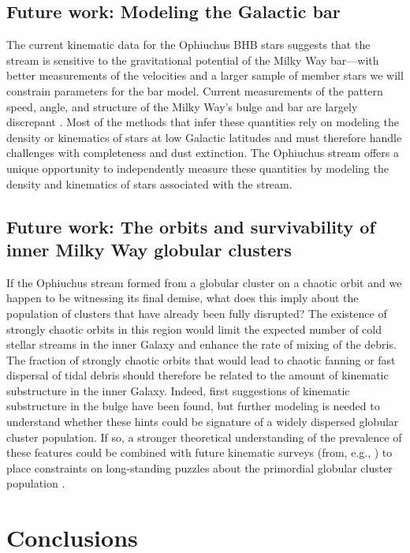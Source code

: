 \documentclass[numberedappendix]{emulateapj}
\begin{document}
\subsection{Future work: Modeling the Galactic bar}

The current kinematic data for the Ophiuchus BHB stars suggests that the stream is sensitive to the gravitational potential of the Milky Way bar---with better measurements of the velocities and a larger sample of member stars we will constrain parameters for the bar model. Current measurements of the pattern speed, angle, and structure of the Milky Way's bulge and bar are largely discrepant \citep[e.g.,][]{wang12, wang13, wegg13, antoja14}. Most of the methods that infer these quantities rely on modeling the density or kinematics of stars at low Galactic latitudes and must therefore handle challenges with completeness and dust extinction. The Ophiuchus stream offers a unique opportunity to independently measure these quantities by modeling the density and kinematics of stars associated with the stream. 

\subsection{Future work: The orbits and survivability of inner Milky Way globular clusters}

If the Ophiuchus stream formed from a globular cluster on a chaotic orbit and we happen to be witnessing its final demise, what does this imply about the population of clusters that have already been fully disrupted? The existence of strongly chaotic orbits in this region would limit the expected number of cold stellar streams in the inner Galaxy and enhance the rate of mixing of the debris. The fraction of strongly chaotic orbits that would lead to chaotic fanning or fast dispersal of tidal debris should therefore be related to the amount of kinematic substructure in the inner Galaxy. Indeed, first suggestions of kinematic substructure in the bulge have been found, but further modeling is needed to understand whether these hints could be signature of a widely dispersed globular cluster population. If so, a stronger theoretical understanding of the prevalence of these features could be combined with future kinematic surveys (from, e.g., ) to place constraints on long-standing puzzles about the primordial globular cluster population \citep[e.g.,][]{murali97, gnedin97}.

\section{Conclusions}\label{sec:conclusions}
\end{document}
